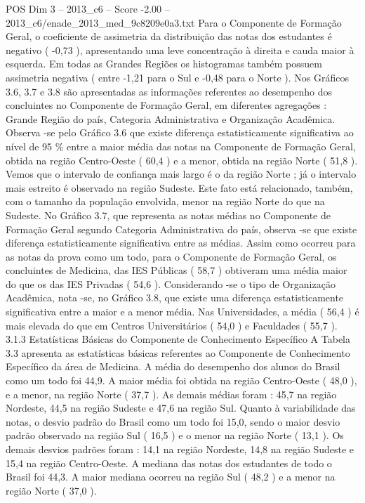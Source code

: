 \begin{textsample}{POS Dim 3 – 2013\_c6 – Score -2.00 – 2013\_c6/enade\_2013\_med\_9c8209e0a3.txt}
Para o Componente de Formação Geral, o coeficiente de assimetria da distribuição das notas dos estudantes é negativo ( -0,73 ), apresentando uma leve concentração à direita e cauda maior à esquerda.
Em todas as Grandes Regiões os histogramas também possuem assimetria negativa ( entre -1,21 para o Sul e -0,48 para o Norte ).
Nos Gráficos 3.6, 3.7 e 3.8 são apresentadas as informações referentes ao desempenho dos concluintes no Componente de Formação Geral, em diferentes agregações : Grande Região do país, Categoria Administrativa e Organização Acadêmica.
Observa -se pelo Gráfico 3.6 que existe diferença estatisticamente significativa ao nível de 95 \% entre a maior média das notas na Componente de Formação Geral, obtida na região Centro-Oeste ( 60,4 ) e a menor, obtida na região Norte ( 51,8 ).
Vemos que o intervalo de confiança mais largo é o da região Norte ; já o intervalo mais estreito é observado na região Sudeste.
Este fato está relacionado, também, com o tamanho da população envolvida, menor na região Norte do que na Sudeste.
No Gráfico 3.7, que representa as notas médias no Componente de Formação Geral segundo Categoria Administrativa do país, observa -se que existe diferença estatisticamente significativa entre as médias.
Assim como ocorreu para as notas da prova como um todo, para o Componente de Formação Geral, os concluintes de Medicina, das IES Públicas ( 58,7 ) obtiveram uma média maior do que os das IES Privadas ( 54,6 ).
Considerando -se o tipo de Organização Acadêmica, nota -se, no Gráfico 3.8, que existe uma diferença estatisticamente significativa entre a maior e a menor média.
Nas Universidades, a média ( 56,4 ) é mais elevada do que em Centros Universitários ( 54,0 ) e Faculdades ( 55,7 ). 3.1.3 Estatísticas Básicas do Componente de Conhecimento Específico A Tabela 3.3 apresenta as estatísticas básicas referentes ao Componente de Conhecimento Específico da área de Medicina.
A média do desempenho dos alunos do Brasil como um todo foi 44,9.
A maior média foi obtida na região Centro-Oeste ( 48,0 ), e a menor, na região Norte ( 37,7 ).
As demais médias foram : 45,7 na região Nordeste, 44,5 na região Sudeste e 47,6 na região Sul.
Quanto à variabilidade das notas, o desvio padrão do Brasil como um todo foi 15,0, sendo o maior desvio padrão observado na região Sul ( 16,5 ) e o menor na região Norte ( 13,1 ).
Os demais desvios padrões foram : 14,1 na região Nordeste, 14,8 na região Sudeste e 15,4 na região Centro-Oeste.
A mediana das notas dos estudantes de todo o Brasil foi 44,3.
A maior mediana ocorreu na região Sul ( 48,2 ) e a menor na região Norte ( 37,0 ).

\end{textsample}
